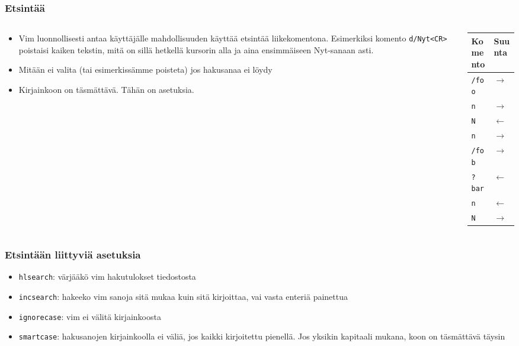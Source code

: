 \documentclass[]{beamer}
\newcommand{\Tohj}[1]{\texttt{#1}}
\newcommand{\com}[1]{{\color{blue!50!black}\Tohj{#1}} \!\!}
\newcommand{\set}[1]{\texttt{#1}}
\begin{document}
\begin{frame}
    \frametitle{Etsintää}
    \begin{columns}
    \begin{column}{0.7\textwidth}
        \begin{itemize}
            \item Vim luonnollisesti antaa käyttäjälle mahdollisuuden käyttää etsintää liikekomentona. Esimerkiksi komento \com{d/Nyt<CR>} poistaisi kaiken tekstin, mitä on sillä hetkellä kursorin alla ja aina ensimmäiseen Nyt-sanaan asti. 
            \item Mitään ei valita (tai esimerkissämme poisteta) jos hakusanaa ei löydy
            \item Kirjainkoon on täsmättävä. Tähän on asetuksia.
        \end{itemize}
    \end{column}
    \begin{column}{0.2\textwidth}
        \begin{tabular}{|ll|}
        \hline
        Komento & Suunta \\
        \hline\hline
        \com{/foo}  & $\rightarrow$ \\
        \com{n}     & $\rightarrow$ \\
        \com{N}     & $\leftarrow$ \\
        \com{n}     & $\rightarrow$ \\
        \com{/fob}  & $\rightarrow$ \\
        \com{?bar}  & $\leftarrow$ \\
        \com{n}     & $\leftarrow$ \\
        \com{N}     & $\rightarrow$ \\
        \hline
        \end{tabular}
    \end{column}
    \end{columns}
\end{frame}

\begin{frame}
    \frametitle{Etsintään liittyviä asetuksia}
    \begin{itemize} 
        \item \set{hlsearch}: värjääkö vim hakutulokset tiedostosta
        \item \set{incsearch}: hakeeko vim sanoja sitä mukaa kuin sitä kirjoittaa, vai vasta enteriä painettua
        \item \set{ignorecase}: vim ei välitä kirjainkoosta
        \item \set{smartcase}: hakusanojen kirjainkoolla ei väliä, jos kaikki kirjoitettu pienellä. Jos yksikin kapitaali mukana, koon on täsmättävä täysin
    \end{itemize}
\end{frame}
\end{document}
